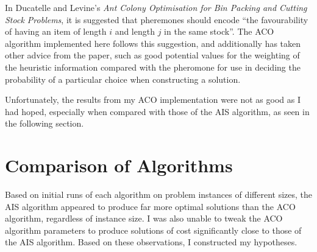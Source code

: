 \documentclass{article}
\begin{document}
    \bigskip

    In Ducatelle and Levine's \textit{Ant Colony Optimisation for Bin Packing and Cutting Stock Problems}\cite{acoforcsp}, it is suggested that pheremones should encode \enquote{the favourability of having an item of length \(i\) and length \(j\) in the same \textelp{} stock}. The ACO algorithm implemented here follows this suggestion, and additionally has taken other advice from the paper, such as good potential values for the weighting of the heuristic information compared with the pheromone for use in deciding the probability of a particular choice when constructing a solution.

    \bigskip

    Unfortunately, the results from my ACO implementation were not as good as I had hoped, especially when compared with those of the AIS algorithm, as seen in the following section.

\section{Comparison of Algorithms}

  Based on initial runs of each algorithm on problem instances of different sizes, the AIS algorithm appeared to produce far more optimal solutions than the ACO algorithm, regardless of instance size. I was also unable to tweak the ACO algorithm parameters to produce solutions of cost significantly close to those of the AIS algorithm. Based on these observations, I constructed my hypotheses.
\end{document}
